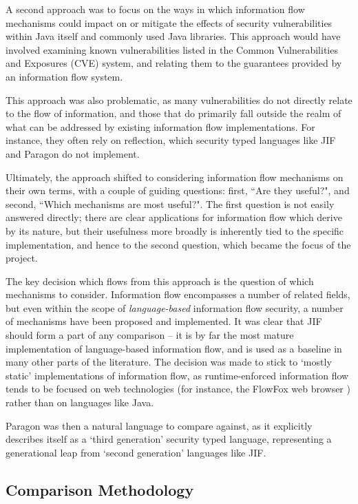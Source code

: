 A second approach was to focus on the ways in which information flow mechanisms could impact on or mitigate the effects of security vulnerabilities within Java itself and commonly used Java libraries. This approach would have involved examining known vulnerabilities listed in the Common Vulnerabilities and Exposures (CVE) system, and relating them to the guarantees provided by an information flow system.

This approach was also problematic, as many vulnerabilities do not directly relate to the flow of information, and those that do primarily fall outside the realm of what can be addressed by existing information flow implementations. For instance, they often rely on reflection, which security typed languages like JIF and Paragon do not implement.

Ultimately, the approach shifted to considering information flow mechanisms on their own terms, with a couple of guiding questions: first, ``Are they useful?", and second, ``Which mechanisms are most useful?". The first question is not easily answered directly; there are clear applications for information flow which derive by its nature, but their usefulness more broadly is inherently tied to the specific implementation, and hence to the second question, which became the focus of the project.

The key decision which flows from this approach is the question of which mechanisms to consider. Information flow encompasses a number of related fields, but even within the scope of \textit{language-based} information flow security, a number of mechanisms have been proposed and implemented. It was clear that JIF should form a part of any comparison -- it is by far the most mature implementation of language-based information flow, and is used as a baseline in many other parts of the literature. The decision was made to stick to `mostly static' implementations of information flow, as runtime-enforced information flow tends to be focused on web technologies (for instance, the FlowFox web browser \cite{degroef2012flowfox}) rather than on languages like Java.

Paragon was then a natural language to compare against, as it explicitly describes itself as a `third generation' security typed language, representing a generational leap from `second generation' languages like JIF.

\subsection{Comparison Methodology}

